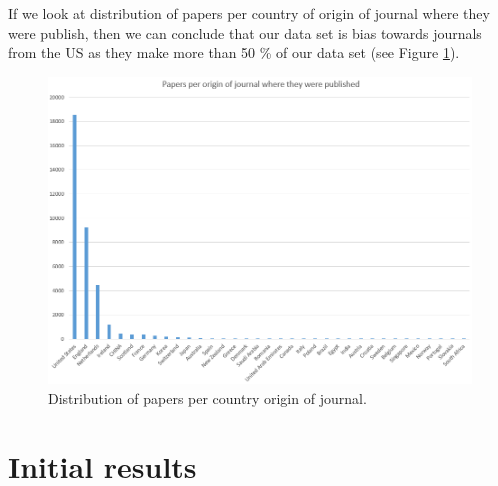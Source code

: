 \documentclass[10pt]{article}
\begin{document}
If we look at distribution of papers per country of origin of journal where they were publish, then we can conclude that our data set is bias towards journals from the US as they make more than 50 \% of our data set (see Figure \ref{dist2}).

\begin{figure}[h!]
\centering
\includegraphics[width=0.98\columnwidth]{Figures/Figure2.png}
\caption{\label{dist2}Distribution of papers per country origin of journal.}
\end{figure}

\section{Initial results}




\enddocument
\end{document}
